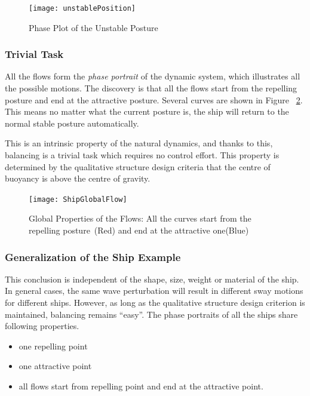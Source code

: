 \begin{figure}[!htbp]
  \begin{center}
      \texttt{[image: unstablePosition]}
    \caption{Phase Plot of the Unstable Posture}
    \label{fig:unStablePosture}
  \end{center}
\end{figure}


\subsubsection*{Trivial Task}
All the flows form the \emph{phase portrait} of the dynamic system, which illustrates all the possible motions. 
The discovery is that all the flows start from the repelling posture and end at the attractive posture.
Several curves are shown in Figure ~\ref{fig:globalflow}.
This means no matter what the current posture is, the ship will return to the normal stable posture automatically.

This is an intrinsic property of the natural dynamics, and thanks to this, balancing is a trivial task which requires no control effort. 
This property is determined by the qualitative structure design criteria that the centre of buoyancy  is above the centre of gravity.

\begin{figure}[!htbp]
  \begin{center}
   \texttt{[image: ShipGlobalFlow]}
   \caption{Global Properties of the Flows: All the curves start from the repelling posture~(Red) and end at the attractive one(Blue)}
   \label{fig:globalflow}
  \end{center}
\end{figure}

 



\subsubsection*{Generalization of the Ship Example} 
This conclusion is independent of the shape, size, weight or material of the ship. 
In general cases, the same wave perturbation will result in different sway motions for different ships.
However, as long as the qualitative structure design criterion is maintained, balancing remains ``easy''.
The phase portraits of all the ships share following properties. 
\begin{itemize}
\item one repelling point 
\item one attractive point 
\item all flows start from repelling point and end at the  attractive point. 
\end{itemize}

